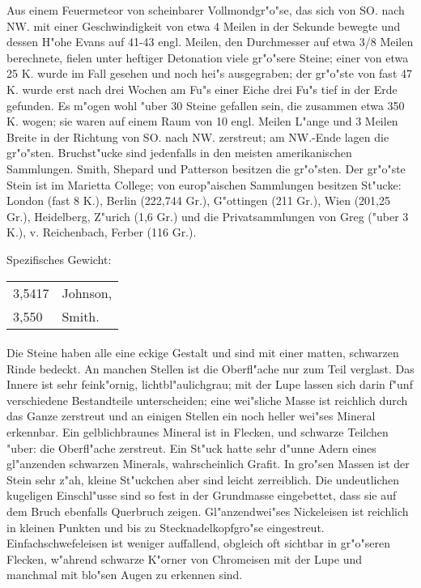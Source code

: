 \documentclass[a4paper, 11pt, oneside]{article}
\begin{document}
Aus einem Feuermeteor von scheinbarer Vollmondgr"o"se, das sich von SO. nach NW. mit einer Geschwindigkeit von etwa 4 Meilen in der Sekunde bewegte und dessen H"ohe Evans auf 41-43 engl. Meilen, den Durchmesser auf etwa 3/8 Meilen berechnete, fielen unter heftiger Detonation viele gr"o"sere Steine; einer von etwa 25 K. wurde im Fall gesehen und noch hei"s ausgegraben; der gr"o"ste von fast 47 K. wurde erst nach drei Wochen am Fu"s einer Eiche drei Fu"s tief in der Erde gefunden. Es m"ogen wohl "uber 30 Steine gefallen sein, die zusammen etwa 350 K. wogen; sie waren auf einem Raum von 10 engl. Meilen L"ange und 3 Meilen Breite in der Richtung von SO. nach NW. zerstreut; am NW.-Ende lagen die gr"o"sten. Bruchst"ucke sind jedenfalls in den meisten amerikanischen Sammlungen. Smith, Shepard und Patterson besitzen die gr"o"sten. Der gr"o"ste Stein ist im Marietta College; von europ"aischen Sammlungen besitzen St"ucke: London (fast 8 K.), Berlin (222,744 Gr.), G"ottingen (211 Gr.), Wien (201,25 Gr.), Heidelberg, Z"urich (1,6 Gr.) und die Privatsammlungen von Greg ("uber 3 K.), v. Reichenbach, Ferber (116 Gr.).

Spezifisches Gewicht:  
\begin{table}[!ht]
    \centering
    \begin{tabular}{l l}
        3,5417 & Johnson,\\
        3,550 & Smith.
    \end{tabular}
\end{table}
\paragraph{}
Die Steine haben alle eine eckige Gestalt und sind mit einer matten, schwarzen Rinde bedeckt. An manchen Stellen ist die Oberfl"ache nur zum Teil verglast. Das Innere ist sehr feink"ornig, lichtbl"aulichgrau; mit der Lupe lassen sich darin f"unf verschiedene Bestandteile unterscheiden; eine wei"sliche Masse ist reichlich durch das Ganze zerstreut und an einigen Stellen ein noch heller wei"ses Mineral erkennbar. Ein gelblichbraunes Mineral ist in Flecken, und schwarze Teilchen "uber: die Oberfl"ache zerstreut. Ein St"uck hatte sehr d"unne Adern eines gl"anzenden schwarzen Minerals, wahrscheinlich Grafit. In gro"sen Massen ist der Stein sehr z"ah, kleine St"uckchen aber sind leicht zerreiblich. Die undeutlichen kugeligen Einschl"usse sind so fest in der Grundmasse eingebettet, dass sie auf dem Bruch ebenfalls Querbruch zeigen. Gl"anzendwei"ses Nickeleisen ist reichlich in kleinen Punkten und bis zu Stecknadelkopfgro"se eingestreut. Einfachschwefeleisen ist weniger auffallend, obgleich oft sichtbar in gr"o"seren Flecken, w"ahrend schwarze K"orner von Chromeisen mit der Lupe und manchmal mit blo"sen Augen zu erkennen sind.
\end{document}
